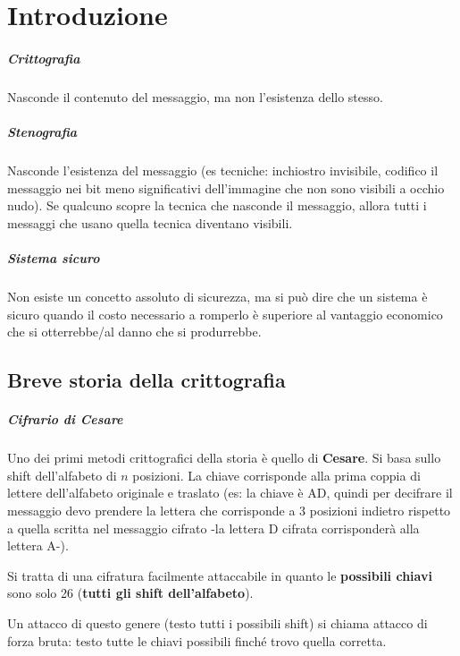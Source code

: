 \chapter{Introduzione}
\label{chapter1}

\paragraph*{Crittografia} Nasconde il contenuto del messaggio, ma non l'esistenza dello stesso.

\paragraph*{Stenografia} Nasconde l'esistenza del messaggio (es tecniche: inchiostro invisibile, codifico il messaggio nei bit meno significativi dell'immagine che non sono visibili a occhio nudo). Se qualcuno scopre la tecnica che nasconde il messaggio, allora tutti i messaggi che usano quella tecnica diventano visibili.

\paragraph*{Sistema sicuro} Non esiste un concetto assoluto di sicurezza, ma si può dire che un sistema è sicuro quando il costo necessario a romperlo è superiore al vantaggio economico che si otterrebbe/al danno che si produrrebbe.

\section{Breve storia della crittografia}

\paragraph*{Cifrario di Cesare} Uno dei primi metodi crittografici della storia è quello di \textbf{Cesare}. Si basa sullo shift dell'alfabeto di $n$ posizioni. La chiave corrisponde alla prima coppia di lettere dell'alfabeto originale e traslato (es: la chiave è AD, quindi per decifrare il messaggio devo prendere la lettera che corrisponde a 3 posizioni indietro rispetto a quella scritta nel messaggio cifrato -la lettera D cifrata corrisponderà alla lettera A-).

Si tratta di una cifratura facilmente attaccabile in quanto le \textbf{possibili chiavi} sono solo 26 (\textbf{tutti gli shift dell'alfabeto}).

Un attacco di questo genere (testo tutti i possibili shift) si chiama attacco di forza bruta: testo tutte le chiavi possibili finché trovo quella corretta.

